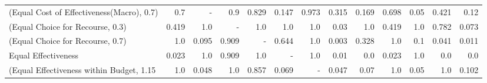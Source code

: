 \documentclass{article}
\begin{document}
\begin{table}[ht]
{\begin{tabular}{lrrrrrrrrrrrr}
(Equal Cost of Effectiveness(Macro), 0.7)          &                                       0.7 &                                         - &                              0.9 &                            0.829 &               0.147 &                                              0.973 &                                              0.315 &                                     0.169 &                                     0.698 &                                      0.05 &                            0.421 &                                       0.12 \\
(Equal Choice for Recourse, 0.3)                   &                                     0.419 &                                       1.0 &                                - &                              1.0 &                 1.0 &                                                1.0 &                                               0.03 &                                       1.0 &                                     0.419 &                                       1.0 &                            0.782 &                                      0.073 \\
(Equal Choice for Recourse, 0.7)                   &                                       1.0 &                                     0.095 &                            0.909 &                                - &               0.644 &                                                1.0 &                                              0.003 &                                     0.328 &                                       1.0 &                                       0.1 &                            0.041 &                                      0.011 \\
Equal Effectiveness                                &                                     0.023 &                                       1.0 &                            0.909 &                              1.0 &                   - &                                                1.0 &                                               0.01 &                                       0.0 &                                     0.023 &                                       1.0 &                              0.0 &                                        0.0 \\
(Equal Effectiveness within Budget, 1.15 &                                       1.0 &                                     0.048 &                              1.0 &                            0.857 &               0.069 &                                                  - &                                              0.047 &                                      0.07 &                                       1.0 &                                      0.05 &                              1.0 &                                      0.102 \\

\end{tabular}}
\end{table}
\end{document}

